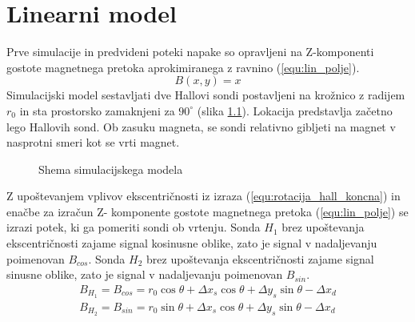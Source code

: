 \chapter{Linearni model}

Prve simulacije in predvideni poteki napake so opravljeni na Z-komponenti gostote magnetnega pretoka aprokimiranega z ravnino (\ref{equ:lin_polje}).
\begin{equation}
\label{equ:lin_polje}
B(x,y)= x
\end{equation}
Simulacijski model sestavljati dve Hallovi sondi postavljeni na krožnico z radijem $r_0$ in sta prostorsko zamaknjeni za $90^\circ$ (slika \ref{lin_simul}). Lokacija predstavlja začetno lego Hallovih sond. 
Ob zasuku magneta, se sondi relativno gibljeti na magnet v nasprotni smeri kot se vrti magnet. 
\begin{figure}[h!]
	\centering
	\caption{Shema simulacijskega modela}
	\label{lin_simul}
\end{figure}

Z upoštevanjem vplivov ekscentričnosti iz izraza (\ref{equ:rotacija_hall_koncna}) in enačbe za izračun Z- komponente gostote magnetnega pretoka (\ref{equ:lin_polje}) se izrazi potek, ki ga pomeriti sondi ob vrtenju. Sonda $H_1$ brez upoštevanja ekscentričnosti zajame signal kosinusne oblike, zato je signal v nadaljevanju poimenovan $B_{cos}$. Sonda $H_2$ brez upoštevanja ekscentričnosti zajame signal sinusne oblike, zato je signal v nadaljevanju poimenovan $B_{sin}$.
\begin{eqnarray}
\label{equ:lin_potek_sin}
B_{H_1}= B_{cos}= r_0 \cos \theta + \Delta x_s \cos \theta+ \Delta y_s \sin \theta -\Delta x_d\\
\label{equ:lin_potek_cos}
B_{H_2}= B_{sin}= r_0 \sin \theta + \Delta x_s \cos \theta+ \Delta y_s \sin \theta -\Delta x_d
\end{eqnarray}

